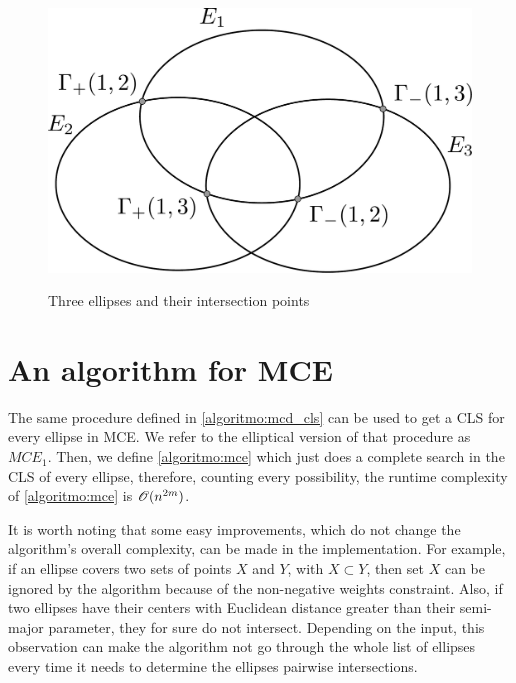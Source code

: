 \begin{figure}[H]
\centering
    \caption{Three ellipses and their intersection points}
    \includegraphics[scale=.32]{tex/figures/3ellipses_intersect.pdf}
    \fautor
    \label{fig:3ellipses_intersect}
\end{figure}
\section{An algorithm for MCE}

The same procedure defined in \autoref{algoritmo:mcd_cls} can be used to get a CLS for every ellipse in MCE. We refer to the elliptical version of that procedure as $MCE_1$. Then, we define \autoref{algoritmo:mce} which just does a complete search in the CLS of every ellipse, therefore, counting every possibility, the runtime complexity of \autoref{algoritmo:mce} is $\mathscr{O}(n^{2m})$.

It is worth noting that some easy improvements, which do not change the algorithm's overall complexity, can be made in the implementation. For example, if an ellipse covers two sets of points $X$ and $Y$, with $X \subset Y$, then set $X$ can be ignored by the algorithm because of the non-negative weights constraint. Also, if two ellipses have their centers with Euclidean distance greater than their semi-major parameter, they for sure do not intersect. Depending on the input, this observation can make the algorithm not go through the whole list of ellipses every time it needs to determine the ellipses pairwise intersections.

